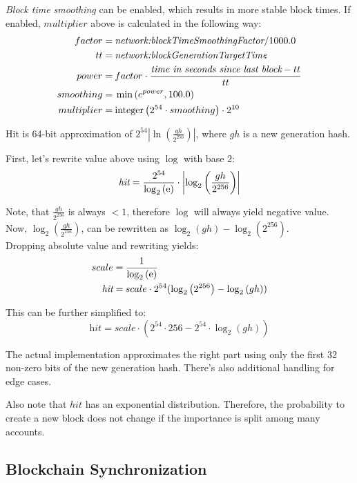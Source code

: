 \emph{Block time smoothing} can be enabled, which results in more stable block times.
If enabled, $multiplier$ above is calculated in the following way:
\begin{align*}
factor = \: & \nemsetting{network}{blockTimeSmoothingFactor} / 1000.0 \\
tt = \: & \nemsetting{network}{blockGenerationTargetTime} \\
power = \: & factor \cdot \frac{\textit{time in seconds since last block} - tt}{tt} \\
smoothing = \: & \min\left(e^{power}, 100.0\right) \\
multiplier = \: & \mathrm{integer}\left(2^{54} \cdot smoothing\right) \cdot 2^{10}
\end{align*}

Hit is 64-bit approximation of $2^{54} \left|\ln\left(\frac{gh}{2^{256}}\right)\right|$, where $gh$ is a new generation hash.

First, let's rewrite value above using $\log$ with base $2$:
$$
\textit{hit} = \frac{2^{54}}{\log_2\left(\mathrm{e}\right)} \cdot \left|\log_2\left(\frac{gh}{2^{256}}\right)\right|
$$

Note, that $\frac{gh}{2^{256}}$ is always $< 1$, therefore $\log$ will always yield negative value. \\
Now, $\log_2\left(\frac{gh}{2^{256}}\right)$, can be rewritten as $\log_2\left(gh\right) - \log_2\left(2^{256}\right)$. \\

Dropping absolute value and rewriting yields:
\begin{align*}
	scale = \: & \frac{1}{\log_2\left(\mathrm{e}\right)} \\
	\textit{hit} = \: & scale \cdot 2^{54} (\log_2\left(2^{256}\right) - \log_2\left(gh\right))
\end{align*}

This can be further simplified to:
$$
\textit{hit} =  scale \cdot ( 2^{54} \cdot 256 -  2^{54} \cdot \log_2\left(gh\right))
$$

The actual implementation approximates the right part using only the first 32 non-zero bits of the new generation hash.
There's also additional handling for edge cases.

Also note that $\mathit{hit}$ has an exponential distribution. Therefore, the probability to create a new block does not change if the importance is split among many accounts.

\subsection{Blockchain Synchronization}
\label{sec:blockSync}

